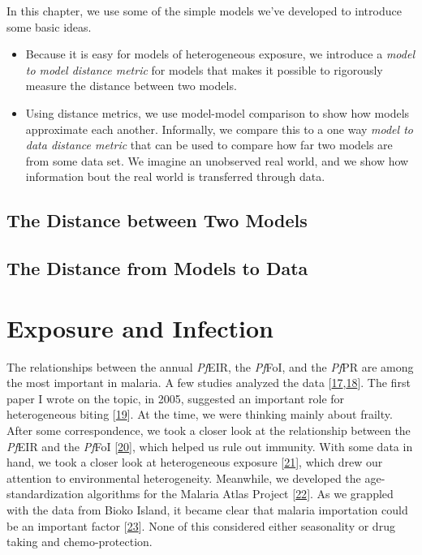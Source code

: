 \documentclass[
]{book}
\begin{document}
In this chapter, we use some of the simple models we've developed to introduce some basic ideas.

\begin{itemize}
\item
  Because it is easy for models of heterogeneous exposure, we introduce a \emph{model to model distance metric} for models that makes it possible to rigorously measure the distance between two models.
\item
  Using distance metrics, we use model-model comparison to show how models approximate each another. Informally, we compare this to a one way \emph{model to data distance metric} that can be used to compare how far two models are from some data set. We imagine an unobserved real world, and we show how information bout the real world is transferred through data.
\end{itemize}

\hypertarget{the-distance-between-two-models}{%
\section{The Distance between Two Models}\label{the-distance-between-two-models}}

\hypertarget{the-distance-from-models-to-data}{%
\section{The Distance from Models to Data}\label{the-distance-from-models-to-data}}

\hypertarget{exposure-and-infection}{%
\chapter{Exposure and Infection}\label{exposure-and-infection}}

The relationships between the annual \emph{Pf}EIR, the \emph{Pf}FoI, and the \emph{Pf}PR are among the most important in malaria. A few studies analyzed the data {[}\protect\hyperlink{ref-BeierJC1999ShortReport}{17},\protect\hyperlink{ref-HaySI2005UrbanizationMalaria}{18}{]}. The first paper I wrote on the topic, in 2005, suggested an important role for heterogeneous biting {[}\protect\hyperlink{ref-SmithDL2005_EIRvPR}{19}{]}. At the time, we were thinking mainly about frailty. After some correspondence, we took a closer look at the relationship between the \emph{Pf}EIR and the \emph{Pf}FoI {[}\protect\hyperlink{ref-SmithDL2010_InefficientTransmission}{20}{]}, which helped us rule out immunity. With some data in hand, we took a closer look at heterogeneous exposure {[}\protect\hyperlink{ref-CooperL2019ParetoRules}{21}{]}, which drew our attention to environmental heterogeneity. Meanwhile, we developed the age-standardization algorithms for the Malaria Atlas Project {[}\protect\hyperlink{ref-SmithDL2007_StandardizingPfPR}{22}{]}. As we grappled with the data from Bioko Island, it became clear that malaria importation could be an important factor {[}\protect\hyperlink{ref-GuerraCA2019HumanMobility}{23}{]}. None of this considered either seasonality or drug taking and chemo-protection.
\end{document}
